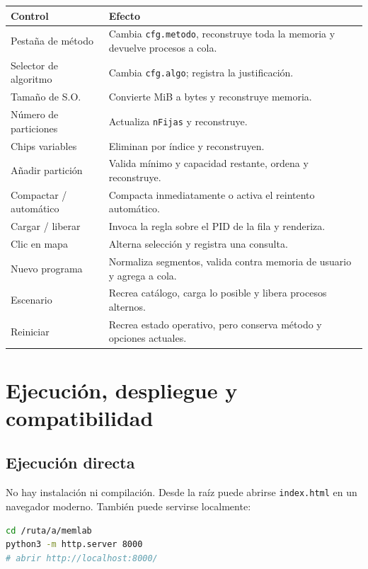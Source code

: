 \documentclass[11pt,a4paper]{article}
\newcommand{\archivo}[1]{\texttt{#1}}
\begin{document}
\begin{longtable}{p{}p{}}
\toprule
\textbf{Control} & \textbf{Efecto}\\
\midrule
\endhead
Pestaña de método & Cambia \texttt{cfg.metodo}, reconstruye toda la memoria y devuelve procesos a cola.\\
Selector de algoritmo & Cambia \texttt{cfg.algo}; registra la justificación.\\
Tamaño de S.O. & Convierte MiB a bytes y reconstruye memoria.\\
Número de particiones & Actualiza \texttt{nFijas} y reconstruye.\\
Chips variables & Eliminan por índice y reconstruyen.\\
Añadir partición & Valida mínimo y capacidad restante, ordena y reconstruye.\\
Compactar / automático & Compacta inmediatamente o activa el reintento automático.\\
Cargar / liberar & Invoca la regla sobre el PID de la fila y renderiza.\\
Clic en mapa & Alterna selección y registra una consulta.\\
Nuevo programa & Normaliza segmentos, valida contra memoria de usuario y agrega a cola.\\
Escenario & Recrea catálogo, carga lo posible y libera procesos alternos.\\
Reiniciar & Recrea estado operativo, pero conserva método y opciones actuales.\\
\bottomrule
\end{longtable}

\section{Ejecución, despliegue y compatibilidad}

\subsection{Ejecución directa}

No hay instalación ni compilación. Desde la raíz puede abrirse \archivo{index.html}
en un navegador moderno. También puede servirse localmente:

\begin{lstlisting}[language=bash]
cd /ruta/a/memlab
python3 -m http.server 8000
# abrir http://localhost:8000/
\end{lstlisting}
\end{document}
